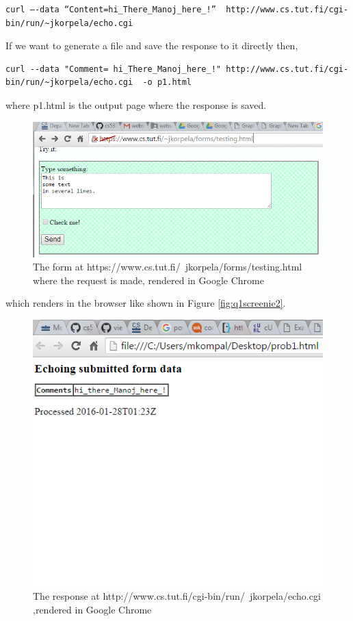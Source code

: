 \documentclass[letterpaper,11pt]{article}
\begin{document}
\begin{lstlisting}[frame=single]
curl –-data “Content=hi_There_Manoj_here_!”  http://www.cs.tut.fi/cgi-bin/run/~jkorpela/echo.cgi
\end{lstlisting}

If we want to generate a file and save the response to it directly then,
\begin{lstlisting}[frame=single]
curl --data "Comment= hi_There_Manoj_here_!" http://www.cs.tut.fi/cgi-bin/run/~jkorpela/echo.cgi  -o p1.html
\end{lstlisting} 
where p1.html is the output page where the response is saved. 



\begin{figure}
\includegraphics[scale=0.9]{requrl.png}
\caption{The form at https://www.cs.tut.fi/~jkorpela/forms/testing.html   where the request is made, rendered in Google Chrome}
\label{fig:screen1}
\end{figure}




\newpage



which renders in the browser like shown in Figure \ref{fig:q1screenie2}.

\begin{figure}
\includegraphics[scale=0.9]{response.png}
\caption{The response at http://www.cs.tut.fi/cgi-bin/run/~jkorpela/echo.cgi ,rendered in Google Chrome}
\label{fig:screen2}
\end{figure}
\end{document}
